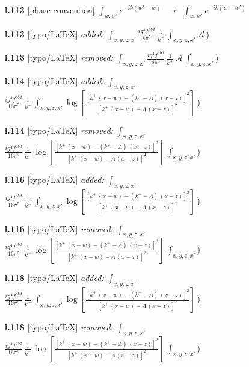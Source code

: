\documentclass[10pt]{article}
\begin{document}
\begin{itemize}[leftmargin=2.2em,itemsep=1pt,topsep=2pt]
\item[\textbf{l.113}] \textsf{\small [phase convention]} $\displaystyle \int_{w,w'}e^{-ik(w'-w)}$\ $\longrightarrow$\ $\displaystyle \int_{w,w'}e^{-ik(w-w')}$
\item[\textbf{l.113}] \textsf{\small [typo/LaTeX]} \emph{added:} $\displaystyle \int_{x,y,z,x'}$$\displaystyle \frac{ig^{4}f^{abd}}{8\pi^{5}}\,\frac{1}{k^{+}}\,\int_{x,y,z,x'}\mathcal{A}\,${\color{gray}\small)}
\item[\textbf{l.113}] \textsf{\small [typo/LaTeX]} \emph{removed:} $\displaystyle \int_{x,y,z,x'}$$\displaystyle \frac{ig^{4}f^{abd}}{8\pi^{5}}\,\frac{1}{k^{+}}\,\mathcal{A}\,\int_{x,y,z,x'}${\color{gray}\small)}
\item[\textbf{l.114}] \textsf{\small [typo/LaTeX]} \emph{added:} $\displaystyle \int_{x,y,z,x'}$$\displaystyle \frac{ig^{4}f^{abd}}{16\pi^{5}}\,\frac{1}{k^{+}}\,\int_{x,y,z,x'}\log{[\frac{[k^{+}\,(x-w)-(k^{+}-\Lambda)\,(x-z)]^{2}}{[k^{+}\,(x-w)-\Lambda\,(x-z)]^{2}}]}\,${\color{gray}\small)}
\item[\textbf{l.114}] \textsf{\small [typo/LaTeX]} \emph{removed:} $\displaystyle \int_{x,y,z,x'}$$\displaystyle \frac{ig^{4}f^{abd}}{16\pi^{5}}\,\frac{1}{k^{+}}\,\log{[\frac{[k^{+}\,(x-w)-(k^{+}-\Lambda)\,(x-z)]^{2}}{[k^{+}\,(x-w)-\Lambda\,(x-z)]^{2}}]}\,\int_{x,y,z,x'}${\color{gray}\small)}
\item[\textbf{l.116}] \textsf{\small [typo/LaTeX]} \emph{added:} $\displaystyle \int_{x,y,z,x'}$$\displaystyle \frac{ig^{4}f^{abd}}{16\pi^{5}}\,\frac{1}{k^{+}}\,\int_{x,y,z,x'}\log{[\frac{[k^{+}\,(x-w)-(k^{+}-\Lambda)\,(x-z)]^{2}}{[k^{+}\,(x-w)-\Lambda\,(x-z)]^{2}}]}\,${\color{gray}\small)}
\item[\textbf{l.116}] \textsf{\small [typo/LaTeX]} \emph{removed:} $\displaystyle \int_{x,y,z,x'}$$\displaystyle \frac{ig^{4}f^{abd}}{16\pi^{5}}\,\frac{1}{k^{+}}\,\log{[\frac{[k^{+}\,(x-w)-(k^{+}-\Lambda)\,(x-z)]^{2}}{[k^{+}\,(x-w)-\Lambda\,(x-z)]^{2}}]}\,\int_{x,y,z,x'}${\color{gray}\small)}
\item[\textbf{l.118}] \textsf{\small [typo/LaTeX]} \emph{added:} $\displaystyle \int_{x,y,z,x'}$$\displaystyle \frac{ig^{4}f^{abd}}{16\pi^{5}}\,\frac{1}{k^{+}}\,\int_{x,y,z,x'}\log{[\frac{[k^{+}\,(x-w)-(k^{+}-\Lambda)\,(x-z)]^{2}}{[k^{+}\,(x-w)-\Lambda\,(x-z)]^{2}}]}\,${\color{gray}\small)}
\item[\textbf{l.118}] \textsf{\small [typo/LaTeX]} \emph{removed:} $\displaystyle \int_{x,y,z,x'}$$\displaystyle \frac{ig^{4}f^{abd}}{16\pi^{5}}\,\frac{1}{k^{+}}\,\log{[\frac{[k^{+}\,(x-w)-(k^{+}-\Lambda)\,(x-z)]^{2}}{[k^{+}\,(x-w)-\Lambda\,(x-z)]^{2}}]}\,\int_{x,y,z,x'}${\color{gray}\small)}
\end{itemize}
\end{document}
